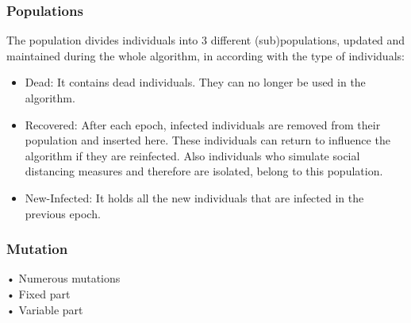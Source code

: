 \documentclass[letterpaper]{article}%
\begin{document}
\subsubsection{Populations}
The population divides individuals into 3 different (sub)populations, updated and maintained during the whole algorithm, in according with the type of individuals:
\begin{itemize}
\item Dead: It contains dead individuals. They can no longer be used in the algorithm.
\item Recovered: After each epoch, infected individuals are removed from their population and inserted here. These individuals can return to influence the algorithm if they are reinfected. Also individuals who simulate social distancing measures and therefore are isolated, belong to this population.
\item New-Infected: It holds all the new individuals that are infected in the previous epoch.
\end{itemize}

\subsubsection{Mutation}
• Numerous mutations\\
• Fixed part\\
• Variable part\\
\end{document}
